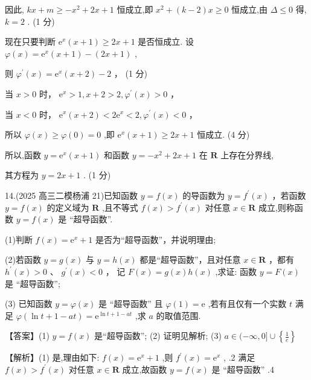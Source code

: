 \documentclass[10pt]{article}
\begin{document}
因此, \({kx} + m \geq   - {x}^{2} + {2x} + 1\) 恒成立,即 \({x}^{2} + \left( {k - 2}\right) x \geq  0\) 恒成立,由 \(\Delta  \leq  0\) 得, \(k = 2\) . (1 分)

现在只要判断 \({\mathrm{e}}^{x}\left( {x + 1}\right)  \geq  {2x} + 1\) 是否恒成立. 设 \(\varphi \left( x\right)  = {\mathrm{e}}^{x}\left( {x + 1}\right)  - \left( {{2x} + 1}\right)\) ,

则 \({\varphi }^{\prime }\left( x\right)  = {\mathrm{e}}^{x}\left( {x + 2}\right)  - 2\) ， (1 分)

当 \(x > 0\) 时， \({\mathrm{e}}^{x} > 1,x + 2 > 2,{\varphi }^{\prime }\left( x\right)  > 0\) ，

当 \(x < 0\) 时， \({\mathrm{e}}^{x}\left( {x + 2}\right)  < 2{\mathrm{e}}^{x} < 2,{\varphi }^{\prime }\left( x\right)  < 0\) ，

所以 \(\varphi \left( x\right)  \geq  \varphi \left( 0\right)  = 0\) ,即 \({\mathrm{e}}^{x}\left( {x + 1}\right)  \geq  {2x} + 1\) 恒成立. (4 分)

所以,函数 \(y = {\mathrm{e}}^{x}\left( {x + 1}\right)\) 和函数 \(y =  - {x}^{2} + {2x} + 1\) 在 \(\mathbf{R}\) 上存在分界线,

其方程为 \(y = {2x} + 1\) . (1 分)

14.(2025 高三二模杨浦 21)已知函数 \(y = f\left( x\right)\) 的导函数为 \(y = {f}^{\prime }\left( x\right)\) ，若函数 \(y = f\left( x\right)\) 的定义域为 \(\mathbf{R}\) ,且不等式 \(f\left( x\right)  > {f}^{\prime }\left( x\right)\) 对任意 \(x \in  \mathbf{R}\) 成立,则称函数 \(y = f\left( x\right)\) 是 “超导函数”.

(1)判断 \(f\left( x\right)  = {\mathrm{e}}^{x} + 1\) 是否为“超导函数”，并说明理由;

(2)若函数 \(y = g\left( x\right)\) 与 \(y = h\left( x\right)\) 都是“超导函数”，且对任意 \(x \in  \mathbf{R}\) ，都有 \({h}^{\prime }\left( x\right)  > 0\) 、 \({g}^{\prime }\left( x\right)  < 0\) ， 记 \(F\left( x\right)  = g\left( x\right) h\left( x\right)\) ,求证: 函数 \(y = F\left( x\right)\) 是 “超导函数”;

(3) 已知函数 \(y = \varphi \left( x\right)\) 是 “超导函数” 且 \(\varphi \left( 1\right)  = \mathrm{e}\) ,若有且仅有一个实数 \(t\) 满足 \(\varphi \left( {\ln t + 1 - {at}}\right)  = {\mathrm{e}}^{\ln t + 1 - {at}}\) ,求 \(a\) 的取值范围.

【答案】(1) \(y = f\left( x\right)\) 是“超导函数”; (2) 证明见解析; (3) \(a \in  ( - \infty ,0\rbrack  \cup  \left\{  \frac{1}{e}\right\}\)

【解析】(1) 是,理由如下: \(f\left( x\right)  = {\mathrm{e}}^{x} + 1\) ,则 \({f}^{\prime }\left( x\right)  = {\mathrm{e}}^{x}\) , .2 满足 \(f\left( x\right)  > {f}^{\prime }\left( x\right)\) 对任意 \(x \in  \mathbf{R}\) 成立,故函数 \(y = f\left( x\right)\) 是 “超导函数” .4
\end{document}
